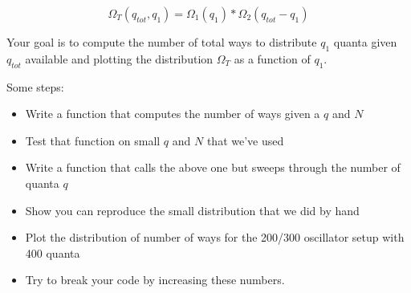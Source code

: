 \[\Omega_T(q_{tot},q_1) = \Omega_1(q_1)*\Omega_2(q_{tot}-q_1)\]

Your goal is to compute the number of total ways to distribute \(q_1\)
quanta given \(q_{tot}\) available and plotting the distribution
\(\Omega_T\) as a function of \(q_1\).

Some steps:

\begin{itemize}
\tightlist
\item
  Write a function that computes the number of ways given a \(q\) and
  \(N\)
\item
  Test that function on small \(q\) and \(N\) that we've used
\item
  Write a function that calls the above one but sweeps through the
  number of quanta \(q\)
\item
  Show you can reproduce the small distribution that we did by hand
\item
  Plot the distribution of number of ways for the 200/300 oscillator
  setup with 400 quanta
\item
  Try to break your code by increasing these numbers.
\end{itemize}

\begin{Shaded}
\begin{Highlighting}[]
\end{Highlighting}
\end{Shaded}
